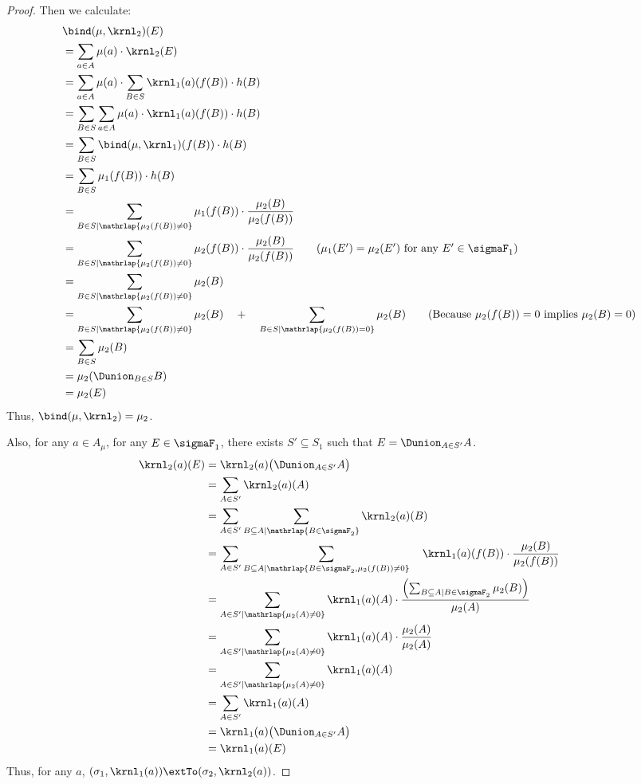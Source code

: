 \begin{proof}
Then we calculate:
  \begin{align}
      &\bind(\mu, \krnl_2)(E) \notag\\
   &=  \sum_{a\in A} \mu(a) \cdot \krnl_2(E) \notag \\
   &=  \sum_{a\in A} \mu(a) \cdot \sum_{B \in S} \krnl_1(a)(f(B)) \cdot h(B) \notag \\
   &=  \sum_{B \in S}  \sum_{a\in A} \mu(a) \cdot \krnl_1(a)(f(B)) \cdot h(B)  \notag \\
   &=  \sum_{B \in S}  \bind(\mu, \krnl_1)(f(B)) \cdot h(B) \notag  \\
   &=  \sum_{B \in S}  \mu_1(f(B)) \cdot h(B) \notag \\
   &=  \sum_{B \in S \mid \mathrlap{\mu_2(f(B)) \neq 0}}  \mu_1(f(B)) \cdot \frac{\mu_2(B)}{ \mu_2(f(B))} \notag \\
   &=  \sum_{B \in S \mid \mathrlap{\mu_2(f(B)) \neq 0}}  \mu_2(f(B)) \cdot \frac{\mu_2(B)}{\mu_2(f(B))} \tag{$\mu_1(E') = \mu_2(E')$ for any $E' \in \sigmaF_1$}\\
   &=  \sum_{B \in S \mid \mathrlap{\mu_2(f(B)) \neq 0}}  \mu_2(B)  \notag \\
   &=  \sum_{B \in S \mid \mathrlap{\mu_2(f(B)) \neq 0}}  \mu_2(B)
       \quad+\quad
       \sum_{B \in S \mid  \mathrlap{\mu_2(f(B)) = 0}}  \mu_2(B)  \tag{Because $\mu_2(f(B)) = 0$ implies $\mu_2(B) = 0$} \\
   &= \sum_{B \in S}  \mu_2(B) \notag \\
   &= \mu_2(\Dunion_{B \in S} B ) \notag \\
   &= \mu_2(E) \notag
  \end{align}
Thus, $\bind(\mu, \krnl_2)= \mu_2$.

  Also, for any $a \in A_{\mu}$, for any $E \in \sigmaF_1$,
  there exists $S' \subseteq S_1$
  such that $E=\Dunion_{A \in S'} A$.
  \begin{align*}
   \krnl_2(a)(E)
   &= \krnl_2(a)\bigl(\Dunion_{A \in S'} A\bigr) \\
   &= \sum_{A \in S'} \krnl_2(a)(A) \\
   &= \sum_{A \in S'} \sum_{B \subseteq A \mid \mathrlap{B \in \sigmaF_2}} \krnl_2(a)(B)\\
&= \sum_{A \in S'}
        \sum_{B \subseteq A \mid \mathrlap{B \in \sigmaF_2, \mu_2(f(B)) \neq 0}}
          \quad\krnl_1(a)(f(B)) \cdot \frac{\mu_2(B)}{\mu_2(f(B))} \\
&= \sum_{A \in S' \mid \mathrlap{\mu_2(A) \neq 0}} \krnl_1(a)(A) \cdot \frac{\left(\sum_{B \subseteq A \mid B \in \sigmaF_2}  \mu_2(B) \right) }{\mu_2(A)} \\
   &= \sum_{A \in S' \mid \mathrlap{\mu_2(A) \neq 0}} \krnl_1(a)(A) \cdot \frac{ \mu_2(A)}{ \mu_2(A)} \\
   &= \sum_{A \in S' \mid \mathrlap{\mu_2(A) \neq 0}} \krnl_1(a)(A)  \\
   &= \sum_{A \in S'} \krnl_1(a)(A)  \\
   &= \krnl_1(a)\bigl(\Dunion_{A \in S'} A\bigr)  \\
   &= \krnl_1(a)(E)
  \end{align*}
Thus, for any $a$, $(\sigma_1, \krnl_1(a)) \extTo (\sigma_2, \krnl_2(a))$.
\end{proof}

